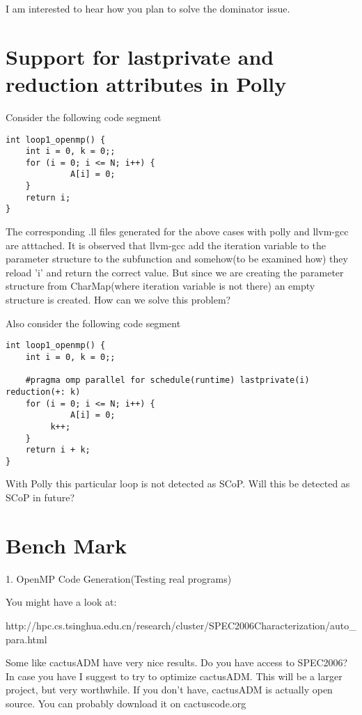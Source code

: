\documentclass[a4paper,10pt]{article}
\begin{document}
I am interested to hear how you plan to solve the dominator issue.

\section{Support for lastprivate and reduction attributes in Polly}

Consider the following code segment

\begin{verbatim}
int loop1_openmp() {
    int i = 0, k = 0;;
    for (i = 0; i <= N; i++) {
             A[i] = 0;
    }
    return i;
}
\end{verbatim}


The corresponding .ll files generated for the above cases with polly and llvm-gcc are atttached. It is observed that llvm-gcc add the iteration variable to the parameter structure to the subfunction and somehow(to be examined how) they reload 'i' and return the correct value. But since we are creating the parameter structure from CharMap(where iteration variable is not there) an empty structure is created. How can we solve this problem?

Also consider the following code segment

\begin{verbatim}
int loop1_openmp() {
    int i = 0, k = 0;;

    #pragma omp parallel for schedule(runtime) lastprivate(i) reduction(+: k)
    for (i = 0; i <= N; i++) {
             A[i] = 0;
	     k++;
    }
    return i + k;
}
\end{verbatim}

With Polly this particular loop is not detected as SCoP. Will this be detected as SCoP in future?

\section{Bench Mark}
1. OpenMP Code Generation(Testing real programs)

	You might have a look at:

	http://hpc.cs.tsinghua.edu.cn/research/cluster/SPEC2006Characterization/auto\_para.html

	Some like cactusADM have very nice results. Do you have access to SPEC2006? In case you have I suggest to try to optimize cactusADM.
	This will be a larger project, but very worthwhile. If you don't have,
	     cactusADM is actually open source. You can probably download it
		     on cactuscode.org
\end{document}
